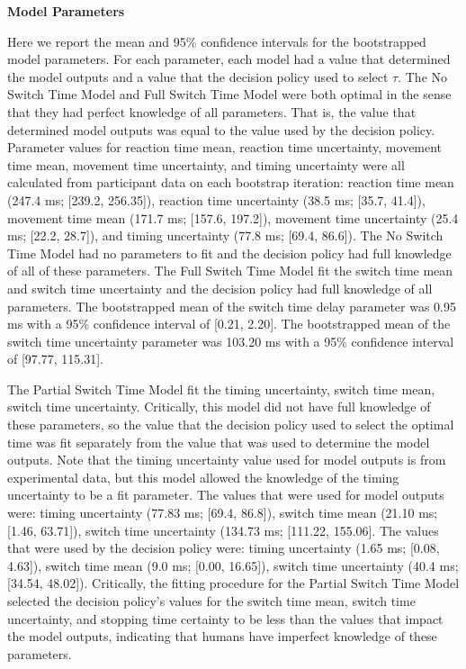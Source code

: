 \documentclass[12pt,letterpaper]{article}
\begin{document}
\noindent \textbf{Model Parameters}

\noindent Here we report the mean and 95\% confidence intervals for the bootstrapped model parameters. For each parameter, each model had a value that determined the model outputs and a value that the decision policy used to select $\tau$. The No Switch Time Model and Full Switch Time Model were both optimal in the sense that they had perfect knowledge of all parameters. That is, the value that determined model outputs was equal to the value used by the decision policy. Parameter values for reaction time mean, reaction time uncertainty, movement time mean, movement time uncertainty, and timing uncertainty were all calculated from participant data on each bootstrap iteration: reaction time mean (247.4 ms; [239.2, 256.35]), reaction time uncertainty (38.5 ms; [35.7, 41.4]), movement time mean (171.7 ms; [157.6, 197.2]), movement time uncertainty (25.4 ms; [22.2, 28.7]), and timing uncertainty (77.8 ms; [69.4, 86.6]). The No Switch Time Model had no parameters to fit and the decision policy had full knowledge of all of these parameters. The Full Switch Time Model fit the switch time mean and switch time uncertainty and the decision policy had full knowledge of all parameters. The bootstrapped mean of the switch time delay parameter was 0.95 ms with a 95\% confidence interval of [0.21, 2.20]. The bootstrapped mean of the switch time uncertainty parameter was 103.20 ms with a 95\% confidence interval of [97.77, 115.31].

The Partial Switch Time Model fit the timing uncertainty, switch time mean, switch time uncertainty. Critically, this model did not have full knowledge of these parameters, so the value that the decision policy used to select the optimal time was fit separately from the value that was used to determine the model outputs. Note that the timing uncertainty value used for model outputs is from experimental data, but this model allowed the knowledge of the timing uncertainty to be a fit parameter. The values that were used for model outputs were: timing uncertainty (77.83 ms; [69.4, 86.8]), switch time mean (21.10 ms; [1.46, 63.71]), switch time uncertainty (134.73 ms; [111.22, 155.06]. The values that were used by the decision policy were: timing uncertainty (1.65 ms;  [0.08, 4.63]), switch time mean (9.0 ms; [0.00, 16.65]), switch time uncertainty (40.4 ms; [34.54, 48.02]). Critically, the fitting procedure for the Partial Switch Time Model selected the decision policy’s values for the switch time mean, switch time uncertainty, and stopping time certainty to be less than the values that impact the model outputs, indicating that  humans have imperfect knowledge of these parameters.
\end{document}
